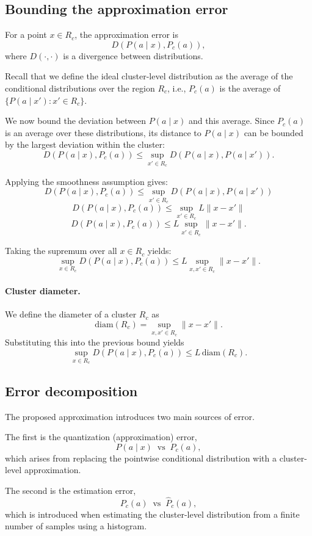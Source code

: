 \subsection{Bounding the approximation error}

For a point \(x \in R_c\), the approximation error is
\[
D(P(a \mid x), P_c(a)),
\]
where \(D(\cdot,\cdot)\) is a divergence between distributions.

Recall that we define the ideal cluster-level distribution as the average of
the conditional distributions over the region \(R_c\), i.e., \(P_c(a)\) is the
average of \(\{P(a \mid x') : x' \in R_c\}\).

We now bound the deviation between \(P(a \mid x)\) and this average. Since
\(P_c(a)\) is an average over these distributions, its distance to
\(P(a \mid x)\) can be bounded by the largest deviation within the cluster:
\[
D(P(a \mid x), P_c(a))
\le
\sup_{x' \in R_c} D(P(a \mid x), P(a \mid x')).
\]

Applying the smoothness assumption gives:
\[
D(P(a \mid x), P_c(a))
\le
\sup_{x' \in R_c} D(P(a \mid x), P(a \mid x'))
\]
\[
D(P(a \mid x), P_c(a))
\le
\sup_{x' \in R_c} L \|x - x'\|
\]
\[
D(P(a \mid x), P_c(a))
\le
L \sup_{x' \in R_c} \|x - x'\|.
\]

Taking the supremum over all \(x \in R_c\) yields:
\[
\sup_{x \in R_c} D(P(a \mid x), P_c(a))
\le
L \sup_{x,x' \in R_c} \|x - x'\|.
\]

\paragraph{Cluster diameter.}
We define the diameter of a cluster \(R_c\) as
\[
\mathrm{diam}(R_c) = \sup_{x,x' \in R_c} \|x - x'\|.
\]
Substituting this into the previous bound yields
\[
\sup_{x \in R_c} D(P(a \mid x), P_c(a))
\le
L \, \mathrm{diam}(R_c).
\]


\subsection{Error decomposition}

The proposed approximation introduces two main sources of error. 

The first is the quantization (approximation) error,
\[
P(a \mid x) \;\;\text{vs}\;\; P_c(a),
\]
which arises from replacing the pointwise conditional distribution with a
cluster-level approximation. 

The second is the estimation error,
\[
P_c(a) \;\;\text{vs}\;\; \hat{P}_c(a),
\]
which is introduced when estimating the cluster-level distribution from a
finite number of samples using a histogram.

